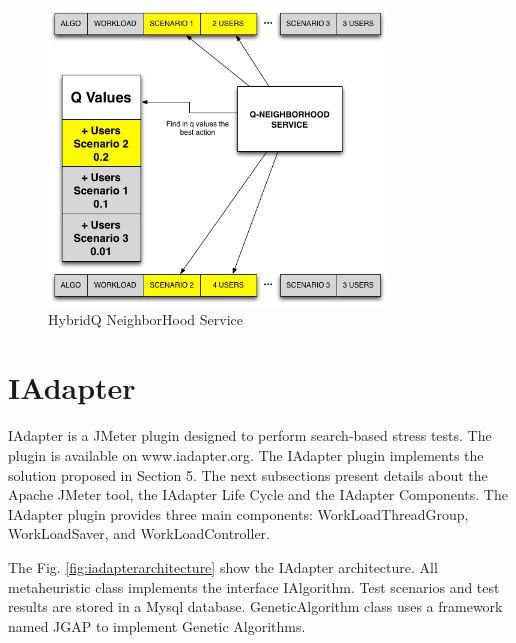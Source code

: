 \begin{figure}[h]
\center
\includegraphics[width=0.8\textwidth]{./images/q-neighborservice.png}
\caption{HybridQ NeighborHood Service}
\label{fig:neighservice}
\end{figure}


\section{IAdapter}

IAdapter is a JMeter plugin designed to perform search-based stress tests.  The plugin is available on www.iadapter.org.  The IAdapter plugin implements the solution proposed in Section 5. The next subsections present details about the Apache JMeter tool, the IAdapter Life Cycle and the IAdapter Components. The IAdapter plugin provides three main components: WorkLoadThreadGroup, WorkLoadSaver, and WorkLoadController.

The Fig. \ref{fig:iadapterarchitecture} show the IAdapter architecture. All metaheuristic class implements the interface IAlgorithm. Test scenarios  and test results are stored in a Mysql database. GeneticAlgorithm class uses a framework named JGAP to implement Genetic Algorithms.


